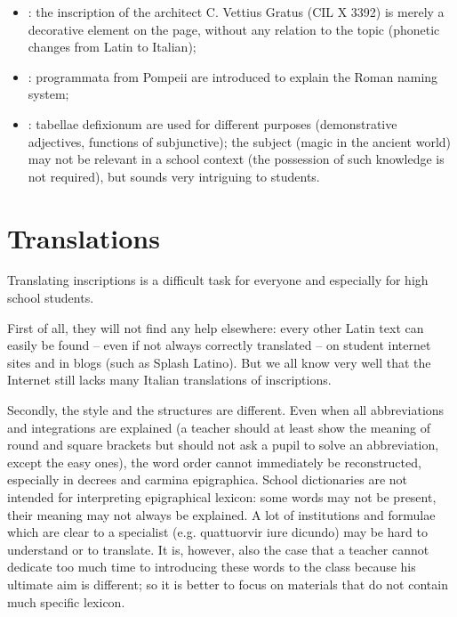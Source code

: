 \documentclass[amsthm,ebook]{saparticle}
\begin{document}
\begin{itemize}
\item \citet[39]{Barbieri2015}: the inscription of the architect C. Vettius Gratus (CIL X 3392) is
merely a decorative element on the page, without any relation to the topic (phonetic changes from Latin to Italian);

\item \citet[40]{Domenici2012}: programmata from Pompeii are introduced to explain the Roman
naming system;

\item \citet[269-270]{Gambis2013}: tabellae defixionum are used for
different purposes (demonstrative adjectives, functions of subjunctive); the subject (magic in the ancient world) may
not be relevant in a school context (the possession of such knowledge is not required), but sounds very intriguing to
students.
\end{itemize}



\section{Translations}
\noindent Translating inscriptions is a difficult task for everyone and especially for high school students.

First of all, they will not find any help elsewhere: every other Latin text can easily be found – even if not always
correctly translated – on student internet sites and in blogs (such as Splash Latino). But we all know very well that
the Internet still lacks many Italian translations of inscriptions.

Secondly, the style and the structures are different. Even when all abbreviations and integrations are explained (a
teacher should at least show the meaning of round and square brackets but should not ask a pupil to solve an
abbreviation, except the easy ones), the word order cannot immediately be reconstructed, especially in decrees and
carmina epigraphica. School dictionaries are not intended for interpreting epigraphical lexicon: some words may not be
present, their meaning may not always be explained. A lot of institutions and formulae which are clear to a specialist
(e.g. quattuorvir iure dicundo) may be hard to understand or to translate. It is, however, also the case that a teacher
cannot dedicate too much time to introducing these words to the class because his ultimate aim is different; so it is
better to focus on materials that do not contain much specific lexicon.
\end{document}
